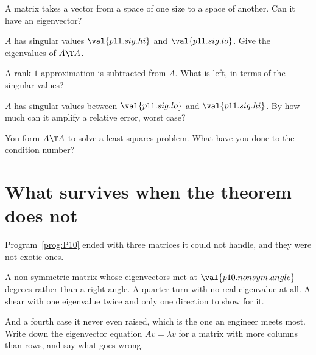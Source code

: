 \begin{quiz}
\item A matrix takes a vector from a space of one size to a space of another.
  Can it have an eigenvector? 
\item $A$ has singular values $\val{p11.sig.hi}$ and $\val{p11.sig.lo}$. Give
  the eigenvalues of $A\T A$. 
\item A rank-$1$ approximation is subtracted from $A$. What is left, in terms
  of the singular values? 
\item $A$ has singular values between $\val{p11.sig.lo}$ and
  $\val{p11.sig.hi}$. By how much can it amplify a relative error, worst case?
\item You form $A\T A$ to solve a least-squares problem. What have you done to
  the condition number? 
\end{quiz}

\section{What survives when the theorem does not}
\label{sec:P11-svd}

\begin{fr}
Program~\ref{prog:P10} ended with three matrices it could not handle, and they
were not exotic ones.

A non-symmetric matrix whose eigenvectors met at
$\val{p10.nonsym.angle}$ degrees rather than a right angle. A quarter turn with
no real eigenvalue at all. A shear with one eigenvalue twice and only one
direction to show for it.

And a fourth case it never even raised, which is the one an engineer meets
most. Write down the eigenvector equation $Av = \lambda v$ for a matrix with
more columns than rows, and say what goes wrong.
\dotline
\nextframe
\end{fr}

